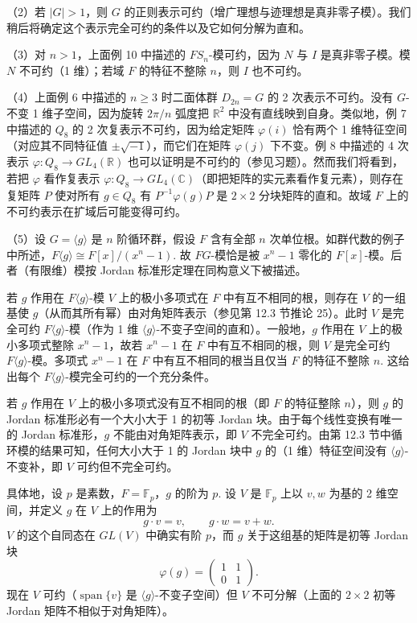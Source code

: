 （2）若 \(|G| > 1\)，则 \(G\) 的正则表示可约（增广理想与迹理想是真非零子模）。我们稍后将确定这个表示完全可约的条件以及它如何分解为直和。

（3）对 \(n > 1\)，上面例 10 中描述的 \(FS_n\)-模可约，因为 \(N\) 与 \(I\) 是真非零子模。模 \(N\) 不可约（1 维）；若域 \(F\) 的特征不整除 \(n\)，则 \(I\) 也不可约。

（4）上面例 6 中描述的 \(n \geq 3\) 时二面体群 \(D_{2n} = G\) 的 2 次表示不可约。没有 \(G\)-不变 1 维子空间，因为旋转 \(2\pi/n\) 弧度把 \(\mathbb{R}^2\) 中没有直线映到自身。类似地，例 7 中描述的 \(Q_8\) 的 2 次复表示不可约，因为给定矩阵 \(\varphi(i)\) 恰有两个 1 维特征空间（对应其不同特征值 \(\pm\sqrt{-1}\)），而它们在矩阵 \(\varphi(j)\) 下不变。例 8 中描述的 4 次表示 \(\varphi : Q_8 \to GL_4(\mathbb{R})\) 也可以证明是不可约的（参见习题）。然而我们将看到，若把 \(\varphi\) 看作复表示 \(\varphi : Q_8 \to GL_4(\mathbb{C})\)（即把矩阵的实元素看作复元素），则存在复矩阵 \(P\) 使对所有 \(g \in Q_8\) 有 \(P^{-1}\varphi(g)P\) 是 \(2 \times 2\) 分块矩阵的直和。故域 \(F\) 上的不可约表示在扩域后可能变得可约。

（5）设 \(G = \langle g\rangle\) 是 \(n\) 阶循环群，假设 \(F\) 含有全部 \(n\) 次单位根。如群代数的例子中所述，\(F\langle g\rangle \cong F[x]/(x^n-1)\). 故 \(FG\)-模恰是被 \(x^n-1\) 零化的 \(F[x]\)-模。后者（有限维）模按 Jordan 标准形定理在同构意义下被描述。

若 \(g\) 作用在 \(F\langle g\rangle\)-模 \(V\) 上的极小多项式在 \(F\) 中有互不相同的根，则存在 \(V\) 的一组基使 \(g\)（从而其所有幂）由对角矩阵表示（参见第 12.3 节推论 25）。此时 \(V\) 是完全可约 \(F\langle g\rangle\)-模（作为 1 维 \(\langle g\rangle\)-不变子空间的直和）。一般地，\(g\) 作用在 \(V\) 上的极小多项式整除 \(x^n-1\)，故若 \(x^n-1\) 在 \(F\) 中有互不相同的根，则 \(V\) 是完全可约 \(F\langle g\rangle\)-模。多项式 \(x^n-1\) 在 \(F\) 中有互不相同的根当且仅当 \(F\) 的特征不整除 \(n\). 这给出每个 \(F\langle g\rangle\)-模完全可约的一个充分条件。

若 \(g\) 作用在 \(V\) 上的极小多项式没有互不相同的根（即 \(F\) 的特征整除 \(n\)），则 \(g\) 的 Jordan 标准形必有一个大小大于 1 的初等 Jordan 块。由于每个线性变换有唯一的 Jordan 标准形，\(g\) 不能由对角矩阵表示，即 \(V\) 不完全可约。由第 12.3 节中循环模的结果可知，任何大小大于 1 的 Jordan 块中 \(g\) 的（1 维）特征空间没有 \(\langle g\rangle\)-不变补，即 \(V\) 可约但不完全可约。

具体地，设 \(p\) 是素数，\(F = \mathbb{F}_p\)，\(g\) 的阶为 \(p\). 设 \(V\) 是 \(\mathbb{F}_p\) 上以 \(v, w\) 为基的 2 维空间，并定义 \(g\) 在 \(V\) 上的作用为
\[
g \cdot v = v, \qquad g \cdot w = v+w.
\]
\(V\) 的这个自同态在 \(GL(V)\) 中确实有阶 \(p\)，而 \(g\) 关于这组基的矩阵是初等 Jordan 块
\[
\varphi(g) = \begin{pmatrix}1 & 1\\ 0 & 1\end{pmatrix}.
\]
现在 \(V\) 可约（\(\operatorname{span}\{v\}\) 是 \(\langle g\rangle\)-不变子空间）但 \(V\) 不可分解（上面的 \(2 \times 2\) 初等 Jordan 矩阵不相似于对角矩阵）。

